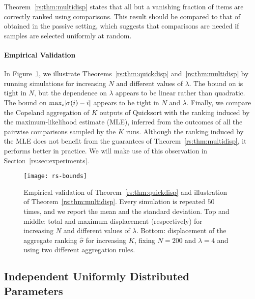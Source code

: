 Theorem~\ref{rs:thm:multidisp} states that all but a vanishing fraction of items are correctly ranked using  comparisons.
This result should be compared to that of \citet{rajkumar2014statistical} obtained in the passive setting, which suggests that  comparisons are needed if samples are selected uniformly at random.

\paragraph{Empirical Validation}

In Figure~\ref{rs:fig:bounds}, we illustrate Theorems~\ref{rs:thm:quickdisp} and~\ref{rs:thm:multidisp} by running simulations for increasing $N$ and different values of $\lambda$.
The bound on \Disp{\sigma} is tight in $N$, but the dependence on $\lambda$ appears to be linear rather than quadratic.
The bound on $\max_i \lvert\sigma(i) - i\rvert$ appears to be tight in $N$ and $\lambda$.
Finally, we compare the Copeland aggregation of $K$ outputs of Quicksort with the ranking induced by the maximum-likelihood estimate (MLE), inferred from the outcomes of all the pairwise comparisons sampled by the $K$ runs.
Although the ranking induced by the MLE does not benefit from the guarantees of Theorem~\ref{rs:thm:multidisp}, it performs better in practice.
We will make use of this observation in Section~\ref{rs:sec:experiments}.

\begin{figure}[p]
\centering
\texttt{[image: rs-bounds]}
\caption{
Empirical validation of Theorem~\ref{rs:thm:quickdisp} and illustration of Theorem~\ref{rs:thm:multidisp}.
Every simulation is repeated $50$ times, and we report the mean and the standard deviation.
Top and middle: total and maximum displacement (respectively) for increasing $N$ and different values of $\lambda$.
Bottom: displacement of the aggregate ranking $\hat{\sigma}$ for increasing $K$, fixing $N = \num{200}$ and $\lambda = \num{4}$ and using two different aggregation rules.
}
\label{rs:fig:bounds}
\end{figure}


\subsection{Independent Uniformly Distributed Parameters}
\label{rs:sec:iidunif}

